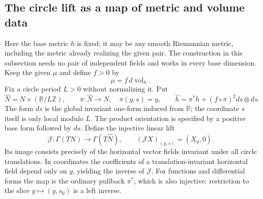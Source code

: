 \subsection{The circle lift as a map of metric and volume data}
\label{subsec:ml-circle}
Here the base metric $h$ is fixed; it may be any smooth Riemannian metric,
including the metric already realizing the given pair. The construction
in this subsection needs no pair of independent fields and works in
every base dimension. Keep the given $\mu$ and define $f>0$ by
\begin{equation}\label{eq:ml-f}
 \mu=f\,d\operatorname{vol}_h.
\end{equation}
Fix a circle period $L>0$ without normalizing it. Put
\begin{equation}\label{eq:ml-lift-metric}
 \widehat N=N\times(\mathbb R/L\mathbb Z),\qquad
 \pi:\widehat N\to N,\quad\pi(y,s)=y,\qquad
 \widehat h=\pi^*h+(f\circ\pi)^2ds\otimes ds.
\end{equation}
The form $ds$ is the global invariant one-form induced from $\mathbb R$;
the coordinate $s$ itself is only local modulo $L$.
The product orientation is specified by a positive base form followed
by $ds$. Define the injective linear lift
\begin{equation}\label{eq:ml-J}
 \mathcal J:\Gamma(TN)\longrightarrow\Gamma(T\widehat N),\qquad
 (\mathcal JX)_{(y,s)}=(X_y,0).
\end{equation}
Its image consists precisely of the horizontal vector fields invariant
under all circle translations. In coordinates the coefficients of a
translation-invariant horizontal field depend only on $y$, yielding
the inverse of $\mathcal J$. For functions and differential forms the
map is the ordinary pullback $\pi^*$, which is also injective:
restriction to the slice $y\mapsto(y,s_0)$ is a left inverse.

